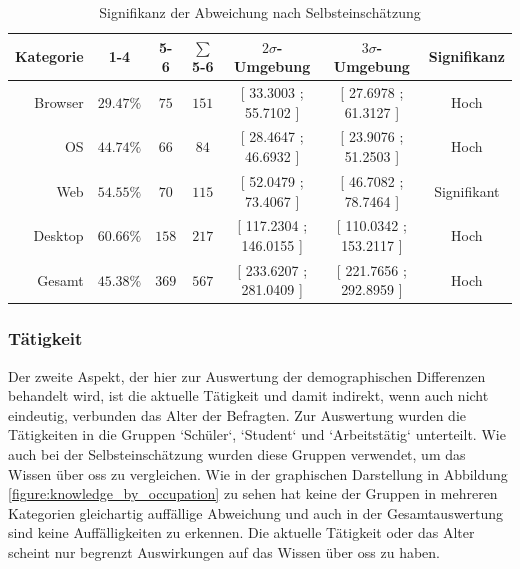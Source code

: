 \documentclass[a4paper]{article}
\begin{document}
                \begin{table}
                    \centering
                    \begin{tabular}{rcccccc}
                        Kategorie & 1-4 & 5-6 & $\sum$ 5-6 & $2\sigma$-Umgebung & $3\sigma$-Umgebung & Signifikanz \\\hline\hline
                        Browser & $29.47\%$ & $75$ & $151$ & \tiny{[ 33.3003 ; 55.7102 ]} & \tiny{[ 27.6978 ; 61.3127 ]} & Hoch\\
                        OS & $44.74\%$ & $66$ & $84$ & \tiny{ [ 28.4647 ; 46.6932 ] } &  \tiny{ [ 23.9076 ; 51.2503 ] } & Hoch\\
                        Web & $54.55\%$ & $70$ & $115$ & \tiny{[ 52.0479 ; 73.4067 ]} &  \tiny{ [ 46.7082 ; 78.7464 ] } &  Signifikant\\
                        Desktop & $60.66\%$ & $158$ & $217$ & \tiny{ [ 117.2304 ; 146.0155 ] } & \tiny{ [ 110.0342 ; 153.2117 ] } & Hoch\\\hline
                        Gesamt & $45.38\%$ & $369$ & $567$ & \tiny{[ 233.6207 ; 281.0409 ]} & \tiny{ [ 221.7656 ; 292.8959 ] } & Hoch
                    \end{tabular}
                    \caption{Signifikanz der Abweichung nach Selbsteinschätzung}
                    \label{table:knowledge_by_category_sigma_self_assessment}
                \end{table}
            
            \subsubsection{Tätigkeit}
                Der zweite Aspekt, der hier zur Auswertung der demographischen Differenzen behandelt wird, ist die aktuelle Tätigkeit und damit indirekt, wenn auch nicht eindeutig, verbunden das Alter der Befragten. Zur Auswertung wurden die Tätigkeiten in die Gruppen `Schüler`, `Student` und `Arbeitstätig` unterteilt. Wie auch bei der Selbsteinschätzung wurden diese Gruppen verwendet, um das Wissen über \gls{oss} zu vergleichen. Wie in der graphischen Darstellung in Abbildung \ref{figure:knowledge_by_occupation} zu sehen hat keine der Gruppen in mehreren Kategorien gleichartig auffällige Abweichung und auch in der Gesamtauswertung sind keine Auffälligkeiten zu erkennen. Die aktuelle Tätigkeit oder das Alter scheint nur begrenzt Auswirkungen auf das Wissen über \gls{oss} zu haben.
            
\end{document}
